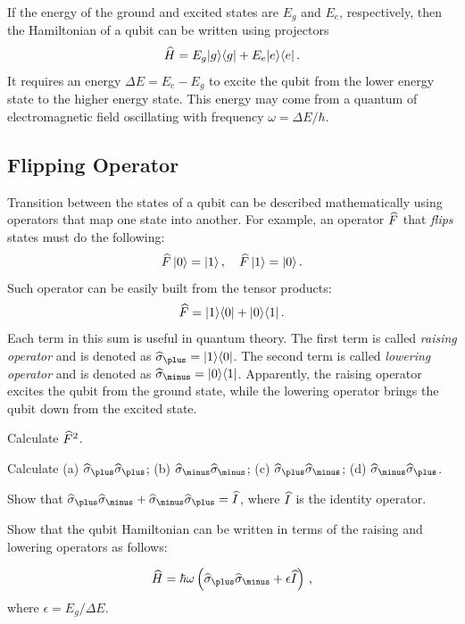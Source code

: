 If the energy of the ground and excited states are $E_g$ and $E_e$, respectively, then the Hamiltonian of a qubit can be written using projectors
\[
\widehat{H} = E_g|{g}\rangle\langle{g}|+E_e|{e}\rangle\langle{e}|\,.
\]
It requires an energy $\Delta E=E_e-E_g$ to excite the qubit from the lower energy state to the higher energy state. This energy may come from a quantum of electromagnetic field oscillating with frequency $\omega=\Delta E/\hbar$.

\subsection{Flipping Operator}
Transition between the states of a qubit can be described mathematically using operators that map one state into another. For example, an operator $\widehat{F}$ that \emph{flips} states must do the following:
\[
\widehat{F}\,|{0}\rangle=|{1}\rangle\,,\quad \widehat{F}\,|{1}\rangle=|{0}\rangle\,.
\]
Such operator can be easily built from the tensor products:
\[
\widehat{F} = |{1}\rangle\langle{0}|+|{0}\rangle\langle{1}|\,.
\]
Each term in this sum is useful in quantum theory. The first term is called \emph{raising operator} and is denoted as 
$ \op{\sigma}_\plus=\ketbra{1}{0}$. The second term is called \emph{lowering operator} and is denoted as $ \op{\sigma}_\minus=\ketbra{0}{1}$. Apparently, the raising operator excites the qubit from the ground state, while the lowering operator brings the qubit down from the excited state.
\begin{exercise}
	Calculate $\widehat{F}^2$.
\end{exercise}
\begin{exercise}
	Calculate (a) $\op{\sigma}_\plus \op{\sigma}_\plus$; (b) $\op{\sigma}_\minus \op{\sigma}_\minus$; (c) $\op{\sigma}_\plus \op{\sigma}_\minus$; (d) $\op{\sigma}_\minus \op{\sigma}_\plus$.
\end{exercise}

\begin{exercise}
	Show that  $\op{\sigma}_\plus \op{\sigma}_\minus+\op{\sigma}_\minus \op{\sigma}_\plus=\op{I}$, where $\widehat{I}$ is the identity operator.
\end{exercise}

\begin{exercise}
	Show that the qubit Hamiltonian can be written in terms of the raising and lowering operators as follows:
	
	\[
	\op{H} = \hbar\omega\left(\op{\sigma}_\plus \op{\sigma}_\minus+\epsilon\op{I} \right)\,,
	\]
	where $\epsilon=E_g/\Delta E$.
\end{exercise}

